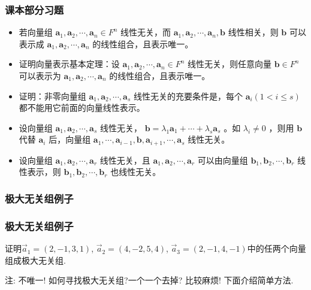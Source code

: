 \begin{frame}\frametitle{课本部分习题}
\begin{itemize}
\item[13.] 若向量组 $\boldsymbol{a}_1,\boldsymbol{a}_2,\cdots,\boldsymbol{a}_n\in F^n$ 线性无关，而 $\boldsymbol{a}_1,\boldsymbol{a}_2,\cdots,\boldsymbol{a}_n,\boldsymbol{b}$ 线性相关，则 $\boldsymbol{b}$ 可以表示成 $\boldsymbol{a}_1,\boldsymbol{a}_2,\cdots,\boldsymbol{a}_n$ 的线性组合，且表示唯一。
\pp
\bigskip

\item[14.] 证明向量表示基本定理：设 $\boldsymbol{a}_1,\boldsymbol{a}_2,\cdots,\boldsymbol{a}_n\in F^n$ 线性无关，则任意向量 $\boldsymbol{b}\in F^n$ 可以表示为 $\boldsymbol{a}_1,\boldsymbol{a}_2,\cdots,\boldsymbol{a}_n$ 的线性组合，且表示唯一。
\pp
\bigskip

\item[15.] 证明：非零向量组 $\boldsymbol{a}_1,\boldsymbol{a}_2,\cdots,\boldsymbol{a}_s$ 线性无关的充要条件是，每个 $\boldsymbol{a}_i(1 < i\leq s)$ 都不能用它前面的向量线性表示。
\pp
\bigskip

\item[16.] 设向量组 $\boldsymbol{a}_1,\boldsymbol{a}_2,\cdots,\boldsymbol{a}_s$ 线性无关， $\boldsymbol{b}=\lambda_1\boldsymbol{a}_1+\cdots+\lambda_s\boldsymbol{a}_s$ 。如 $\lambda_i\neq0$ ，则用 $\boldsymbol{b}$ 代替 $\boldsymbol{a}_i$ 后，向量组 $\boldsymbol{a}_1,\cdots,\boldsymbol{a}_{i - 1},\boldsymbol{b},\boldsymbol{a}_{i + 1},\cdots,\boldsymbol{a}_s$ 线性无关。
\pp
\bigskip

\item[17.] 设向量组 $\boldsymbol{a}_1,\boldsymbol{a}_2,\cdots,\boldsymbol{a}_r$ 线性无关，且 $\boldsymbol{a}_1,\boldsymbol{a}_2,\cdots,\boldsymbol{a}_r$ 可以由向量组 $\boldsymbol{b}_1,\boldsymbol{b}_2,\cdots,\boldsymbol{b}_r$ 线性表示，则 $\boldsymbol{b}_1,\boldsymbol{b}_2,\cdots,\boldsymbol{b}_r$ 也线性无关。
\end{itemize}
\end{frame}








\subsubsection{极大无关组例子}
\begin{frame}\frametitle{极大无关组例子}
\begin{example}
证明$\vec{a}_1=(2,-1,3,1)$, $\vec{a}_2=(4,-2,5,4)$, $\vec{a}_3=(2,-1,4,-1)$中的任两个向量组成极大无关组.
\end{example}
\pp
{}

\pp
注: 不唯一! 如何寻找极大无关组?一个一个去掉? \pp 比较麻烦! \pp 下面介绍简单方法.
\end{frame}





